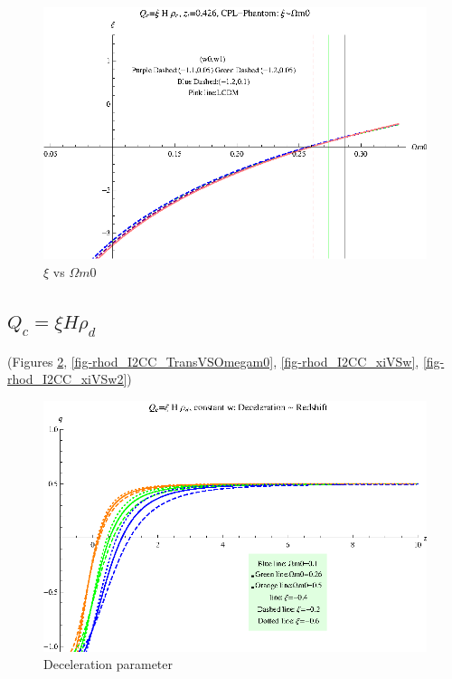 \documentclass[12pt,a4paper]{article}
\begin{document}
\begin{figure}
\centering
\includegraphics[width=500pt]{rhoc_ICCPL_Phan_xiVSOmegam0.eps}
\caption{$\xi$ vs $\Omega m0$}\label{fig-rhoc_ICCPL_Phan_xiVSOmegam0}
\end{figure}










\subsection{$Q_c=\xi H \rho_d$}


(Figures \ref{fig-rhod_I2CC_DecPara}, \ref{fig-rhod_I2CC_TransVSOmegam0}, \ref{fig-rhod_I2CC_xiVSw}, \ref{fig-rhod_I2CC_xiVSw2})

\begin{figure}
\centering
\includegraphics[width=500pt]{rhod_I2CC_DecPara.eps}
\caption{Deceleration parameter}\label{fig-rhod_I2CC_DecPara}
\end{figure}
\end{document}
